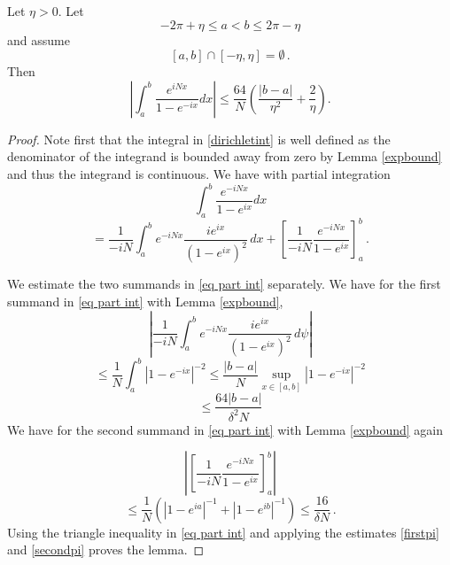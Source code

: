 \begin{lemma}\label{lem diri}
Let $\eta>0$. Let
\begin{equation}
    -2\pi +\eta \le a<b \le 2\pi-\eta
\end{equation}
and assume
\begin{equation}\label{eq abdelta}
    [a,b]\cap [-\eta,\eta]=\emptyset \, .
\end{equation}
Then
    \begin{equation}\label{dirichletint}
    \left|\int_a^b
\frac {e^{iNx}} {1-e^{-ix}}
dx\right| \le \frac{64}N(\frac{|b-a|}{\eta^2}+\frac 2{\eta}).
\end{equation}
\end{lemma}
\begin{proof}
    Note first that the integral in \eqref{dirichletint}
    is well defined as the denominator of the integrand is bounded away from zero by Lemma \ref{expbound}
    and thus the integrand is continuous.
    We have with partial integration
\begin{equation*}
    \int_a^b
\frac {e^{-iNx}} {1-e^{ix}}
dx
\end{equation*}
\begin{equation}\label{eq part int}
=\frac 1{-iN}\int_a^b
{e^{-iNx}}\frac {ie^{ix}} {(1-e^{ix})^2}\, dx
+\left[ \frac 1{-iN}
\frac {e^{-iNx}} {1-e^{ix}}\right]_a^b\, .
\end{equation}


We estimate the two summands in
\eqref{eq part int} separately. We have
for the first summand in \eqref{eq part int}
with Lemma \ref{expbound},
\begin{equation*}
\left|   \frac 1 {-iN}\int_a^b
{e^{-iNx}}\frac{ie^{ix}}
{(1-e^{ix})^2}\,
d\psi\right|
\end{equation*}
\begin{equation}\label{firstpi}
    \le \frac 1N \int_a^b|1-e^{-ix}|^{-2}\le \frac {|b-a|}N\sup_{x\in [a,b]}|1-e^{-ix}|^{-2}
\end{equation}
\begin{equation}
    \le  \frac {64|b-a|}{\delta ^2N}
\end{equation}
We have
for the second summand in \eqref{eq part int}
with Lemma \ref{expbound} again


\begin{equation*}
    \left|\left[ \frac 1{-iN}
\frac {e^{-iNx}} {1-e^{ix}}\right]_a^b\right|
\end{equation*}
\begin{equation}\label{secondpi}
    \le \frac 1N (|1-e^{ia}|^{-1}+|1-e^{ib}|^{-1})
\le \frac {16}{\delta N}\, .
\end{equation}
Using the triangle inequality in \eqref{eq part int}
and applying the estimates \eqref{firstpi} and \eqref{secondpi}  proves the lemma.
\end{proof}



